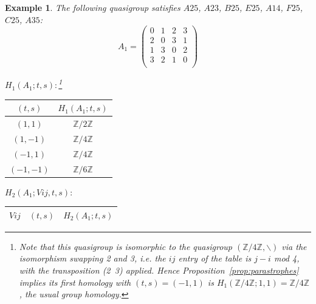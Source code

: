 \documentclass[11pt]{amsart}
\newtheorem{example}[theorem]{Example}
\theoremstyle{definition}
\newcommand{\Z}{\mathbb{Z}}
\begin{document}
\begin{example}

The following quasigroup satisfies $A25$, $A23$, $B25$, $E25$, $A14$, $F25$, $C25$, $A35$:
   \[ A_1 = \left(
\begin{array}{cccc}
 0 & 1 & 2 & 3 \\
 2 & 0 & 3 & 1 \\
 1 & 3 & 0 & 2 \\
 3 & 2 & 1 & 0 \\
\end{array}
\right) \]



\bigskip


$H_1(A_1;t,s):$\footnote{Note that this quasigroup is isomorphic to the quasigroup $(\Z/4\Z, \backslash)$ via the isomorphism swapping 2 and 3, i.e. the $ij$ entry of the table is $j - i$ mod 4, with the transposition (2\, 3) applied. Hence Proposition~\ref{prop:parastrophes} implies its first homology with $(t,s) = (-1,1)$ is $H_1(\Z/4\Z;1,1) = \Z/4\Z$, the usual group homology.}

\begin{center}
    
\begin{tabular}{c|c}
    $(t,s)$ & $H_1(A_1;t,s)$  \\
    \hline
    $(1,1)$ & $\Z/2\Z$ \\
    $(1,-1)$ & $\Z/4\Z$ \\
    $(-1,1)$ & $\Z/4\Z$ \\
    $(-1,-1)$ & $\Z/6\Z$ \\
\end{tabular}
\end{center}
\bigskip

$H_2(A_1;Vij,t,s):$

\begin{center}
    
\begin{tabular}{c|c|c}
    $Vij$ & $(t,s)$ & $H_2(A_1;t,s)$  \\
    \hline


\end{tabular}
\end{center}
\end{example}
\end{document}
